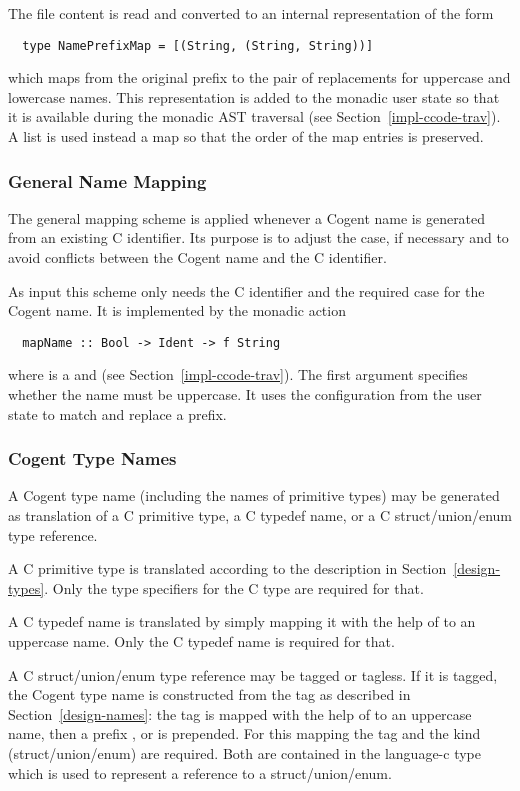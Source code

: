 The file content is read and converted to an internal representation of the form 
\begin{verbatim}
  type NamePrefixMap = [(String, (String, String))]
\end{verbatim}
which maps from the original prefix to the pair of replacements for uppercase and lowercase names.
This representation is added to the monadic user state so that it is available during the monadic AST traversal
(see Section~\ref{impl-ccode-trav}). A list is used instead a map so that the order of the map entries
is preserved.

\subsubsection{General Name Mapping}

The general mapping scheme is applied whenever a Cogent name is generated from an existing C identifier.
Its purpose is to adjust the case, if necessary and to avoid conflicts between the Cogent name and
the C identifier.

As input this scheme only needs the C identifier and the required case for the Cogent name.
It is implemented by the monadic action
\begin{verbatim}
  mapName :: Bool -> Ident -> f String
\end{verbatim}
where  is a  and  
(see Section~\ref{impl-ccode-trav}). The first argument specifies whether the name must be uppercase. 
It uses the configuration from the user state to match and replace a prefix.

\subsubsection{Cogent Type Names}

A Cogent type name (including the names of primitive types) may be generated as translation of a C 
primitive type, a C typedef name, or a C struct/union/enum type reference. 

A C primitive type is translated according to the description in Section~\ref{design-types}. Only the
type specifiers for the C type are required for that.

A C typedef name is translated by simply mapping it with the help of  to an uppercase name.
Only the C typedef name is required for that.

A C struct/union/enum type reference may be tagged or tagless. If it is tagged, the Cogent type name is
constructed from the tag as described in Section~\ref{design-names}: the tag is mapped with the help of
 to an uppercase name, then a prefix ,  or  is 
prepended. For this mapping the tag and the kind (struct/union/enum) are required. Both are contained
in the language-c type  which is used to represent a reference to a struct/union/enum.


